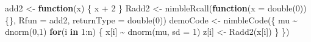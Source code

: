 \documentclass[
  12pt,
]{krantz}
\newenvironment{Shaded}{\begin{snugshade}}{\end{snugshade}}
\newcommand{\AttributeTok}[1]{\textcolor[rgb]{0.77,0.63,0.00}{#1}}
\newcommand{\ControlFlowTok}[1]{\textcolor[rgb]{0.13,0.29,0.53}{\textbf{#1}}}
\newcommand{\DecValTok}[1]{\textcolor[rgb]{0.00,0.00,0.81}{#1}}
\newcommand{\FunctionTok}[1]{\textcolor[rgb]{0.00,0.00,0.00}{#1}}
\newcommand{\NormalTok}[1]{#1}
\newcommand{\OtherTok}[1]{\textcolor[rgb]{0.56,0.35,0.01}{#1}}
\newcommand{\SpecialCharTok}[1]{\textcolor[rgb]{0.00,0.00,0.00}{#1}}
\newcommand{\StringTok}[1]{\textcolor[rgb]{0.31,0.60,0.02}{#1}}
\begin{document}
\begin{Shaded}
\begin{Highlighting}[]
\NormalTok{add2 }\OtherTok{\textless{}{-}} \ControlFlowTok{function}\NormalTok{(x) \{}
\NormalTok{   x }\SpecialCharTok{+} \DecValTok{2} 
\NormalTok{\}}
\NormalTok{Radd2 }\OtherTok{\textless{}{-}} \FunctionTok{nimbleRcall}\NormalTok{(}\ControlFlowTok{function}\NormalTok{(}\AttributeTok{x =} \FunctionTok{double}\NormalTok{(}\DecValTok{0}\NormalTok{))\{\}, }
                     \AttributeTok{Rfun =} \StringTok{\textquotesingle{}add2\textquotesingle{}}\NormalTok{,}
                     \AttributeTok{returnType =} \FunctionTok{double}\NormalTok{(}\DecValTok{0}\NormalTok{))}
\NormalTok{demoCode }\OtherTok{\textless{}{-}} \FunctionTok{nimbleCode}\NormalTok{(\{}
\NormalTok{  mu }\SpecialCharTok{\textasciitilde{}} \FunctionTok{dnorm}\NormalTok{(}\DecValTok{0}\NormalTok{,}\DecValTok{1}\NormalTok{)}
  \ControlFlowTok{for}\NormalTok{(i }\ControlFlowTok{in} \DecValTok{1}\SpecialCharTok{:}\NormalTok{n) \{}
\NormalTok{    x[i] }\SpecialCharTok{\textasciitilde{}} \FunctionTok{dnorm}\NormalTok{(mu, }\AttributeTok{sd =} \DecValTok{1}\NormalTok{)}
\NormalTok{    z[i] }\OtherTok{\textless{}{-}} \FunctionTok{Radd2}\NormalTok{(x[i])}
\NormalTok{    \} }
\NormalTok{\})}


\end{Highlighting}
\end{Shaded}
\end{document}

